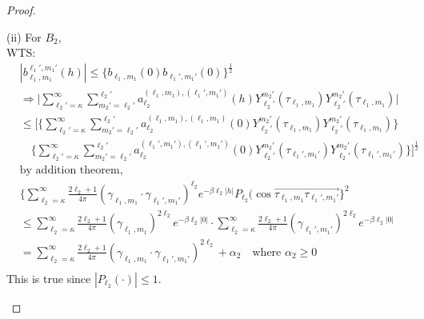\documentclass[11pt]{article}
\begin{document}
\begin{itemize}
\begin{proof}
\begin{enumerate}
(ii) For $B_2$,\\
WTS:\\
\begin{align*}
&|b_{\ell_1,m_1}^{\ell_1',m_1'}(h)| \le \{b_{\ell_1,m_1}(0) b_{\ell_1',m_1'}(0)\}^\frac{1}{2}\\
&\Rightarrow \biggl| \sum_{\ell_2'=\kappa}^{\infty} \sum_{m_2'=\ell_2'}^{\ell_2'} a_{\ell_2}^{(\ell_1,m_1), (\ell_1',m_1')}(h) Y_{\ell_2'}^{m_2'}(\tau_{\ell_1,m_1}) Y_{\ell_2'}^{m_2'}(\tau_{\ell_1,m_1}) \biggl|\\
&\le \Biggl[ \biggl\{ \sum_{\ell_2'=\kappa}^{\infty} \sum_{m_2'=\ell_2'}^{\ell_2'} a_{\ell_2}^{(\ell_1,m_1), (\ell_1,m_1)}(0) Y_{\ell_2'}^{m_2'}(\tau_{\ell_1,m_1}) Y_{\ell_2'}^{m_2'}(\tau_{\ell_1,m_1}) \biggl\}\\ 
&\quad  \biggl\{ \sum_{\ell_2'=\kappa}^{\infty} \sum_{m_2'=\ell_2'}^{\ell_2'} a_{\ell_2}^{(\ell_1',m_1'), (\ell_1',m_1')}(0) Y_{\ell_2'}^{m_2'}(\tau_{\ell_1',m_1'}) Y_{\ell_2'}^{m_2'}(\tau_{\ell_1',m_1'}) \biggl\} \Biggl]^\frac{1}{2}\\
&\text{by addition theorem, }\\
&\biggl\{ \sum_{\ell_2=\kappa}^{\infty} \frac{2\ell_2 + 1}{4\pi} (\gamma_{\ell_1, m_1} \cdot \gamma_{\ell_1',m_1'})^{\ell_2} e^{-\beta \ell_2 |h|} P_{\ell_2}(\cos{\overrightarrow{\tau_{\ell_1,m_1} \tau_{\ell_1',m_1'}}}\biggl\}^2\\
&\le \sum_{\ell_2=\kappa}^{\infty} \frac{2\ell_2 + 1}{4\pi} (\gamma_{\ell_1, m_1})^{2 \ell_2} e^{-\beta \ell_2 |0|} \cdot \sum_{\ell_2=\kappa}^{\infty} \frac{2\ell_2 + 1}{4\pi} (\gamma_{\ell_1', m_1'})^{2 \ell_2} e^{-\beta \ell_2 |0|}\\
&= \sum_{\ell_2=\kappa}^{\infty} \frac{2\ell_2 + 1}{4\pi} (\gamma_{\ell_1, m_1} \cdot \gamma_{\ell_1', m_1'})^{2 \ell_2} + \alpha_2 \quad \text{where } \alpha_2 \ge 0\\
\end{align*}
This is true since $|P_{\ell_2}(\cdot)| \le 1$.\\


\end{enumerate}
\end{proof}
\end{itemize}
\end{document}
